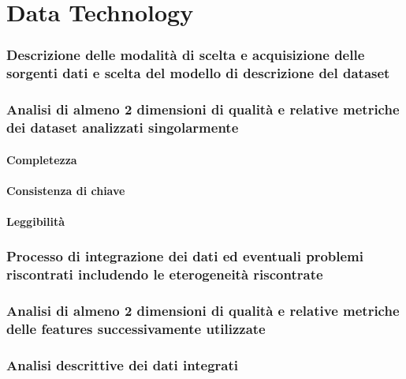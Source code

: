 \part{Data Technology}
\section{Descrizione delle modalità di scelta e acquisizione delle sorgenti dati e scelta del modello di descrizione del dataset}

\section{Analisi di almeno 2 dimensioni di qualità e relative metriche dei dataset analizzati singolarmente}

\subsection{Completezza}

\subsection{Consistenza di chiave}

\subsection{Leggibilità}


\section{Processo di integrazione dei dati ed eventuali problemi riscontrati includendo le eterogeneità riscontrate}
\section{Analisi di almeno 2 dimensioni di qualità e relative metriche delle features successivamente utilizzate}
\section{Analisi descrittive dei dati integrati}
